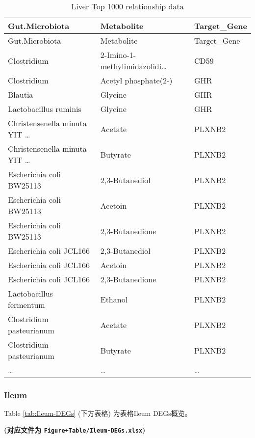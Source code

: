 \documentclass[
]{article}
\begin{document}
\begin{longtable}[]{@{}lll@{}}
\caption{\label{tab:Liver-Top-1000-relationship-data}Liver Top 1000 relationship data}\tabularnewline
\toprule
Gut.Microbiota & Metabolite & Target\_Gene\tabularnewline
\midrule
\endfirsthead
\toprule
Gut.Microbiota & Metabolite & Target\_Gene\tabularnewline
\midrule
\endhead
Clostridium & 2-Imino-1-methylimidazolidi\ldots{} & CD59\tabularnewline
Clostridium & Acetyl phosphate(2-) & GHR\tabularnewline
Blautia & Glycine & GHR\tabularnewline
Lactobacillus ruminis & Glycine & GHR\tabularnewline
Christensenella minuta YIT \ldots{} & Acetate & PLXNB2\tabularnewline
Christensenella minuta YIT \ldots{} & Butyrate & PLXNB2\tabularnewline
Escherichia coli BW25113 & 2,3-Butanediol & PLXNB2\tabularnewline
Escherichia coli BW25113 & Acetoin & PLXNB2\tabularnewline
Escherichia coli BW25113 & 2,3-Butanedione & PLXNB2\tabularnewline
Escherichia coli JCL166 & 2,3-Butanediol & PLXNB2\tabularnewline
Escherichia coli JCL166 & Acetoin & PLXNB2\tabularnewline
Escherichia coli JCL166 & 2,3-Butanedione & PLXNB2\tabularnewline
Lactobacillus fermentum & Ethanol & PLXNB2\tabularnewline
Clostridium pasteurianum & Acetate & PLXNB2\tabularnewline
Clostridium pasteurianum & Butyrate & PLXNB2\tabularnewline
\ldots{} & \ldots{} & \ldots{}\tabularnewline
\bottomrule
\end{longtable}

\hypertarget{ileum}{%
\subsubsection{Ileum}\label{ileum}}

Table \ref{tab:Ileum-DEGs} (下方表格) 为表格Ileum DEGs概览。

\textbf{(对应文件为 \texttt{Figure+Table/Ileum-DEGs.xlsx})}
\end{document}
